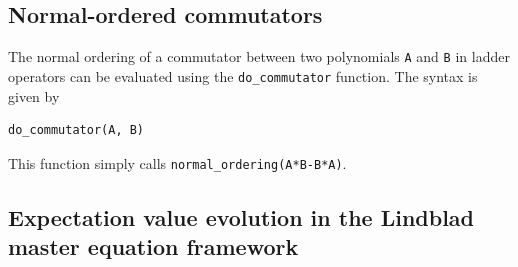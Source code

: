 \documentclass[onecolumn, 12pt, sort&compress]{elsarticle}
\newcounter{bla}
\newcommand{\inlinecode}[1]{\texttt{#1}}
\begin{document}

\subsection{Normal-ordered commutators}
\label{subsec_commutators}

The normal ordering of a commutator between two polynomials \inlinecode{A} and \inlinecode{B} in ladder operators can be evaluated using the \inlinecode{do_commutator} function.  The syntax is given by
\begin{verbatim}
do_commutator(A, B)
\end{verbatim}
This function simply calls \inlinecode{normal_ordering(A*B-B*A)}. 

\subsection{Expectation value evolution in the Lindblad master equation framework}
\end{document}
